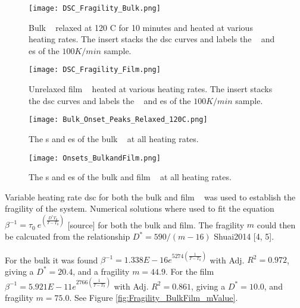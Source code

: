 \documentclass[a4paper,12pt,oneside]{article}%
\begin{document}
\begin{figure}[b]
	\centering
	\texttt{[image: DSC\_Fragility\_Bulk.png]}
	\caption[Table of contents Capition]{Bulk \MgZnCa~ relaxed at 120 \degree C for 10 minutes and heated at various heating rates. The insert stacks the \gls{dsc} curves and labels the \Tg~ and \Tx es of the $100 K/min$ sample.}%
	\label{fig:DSC_vHeatingRate_Bulk}
\end{figure}

\begin{figure}[b]
	\centering
	\texttt{[image: DSC\_Fragility\_Film.png]}
	\caption[Table of contents Capition]{Unrelaxed film \MgZnCa~ heated at various heating rates. The insert stacks the \gls{dsc} curves and labels the \Tg~ and \Tx es of the $100 K/min$ sample.}%
	\label{fig:DSC_vHeatingRate_Film}
\end{figure}

\begin{figure}[b]
	\centering
	\texttt{[image: Bulk\_Onset\_Peaks\_Relaxed\_120C.png]}
	\caption[Table of contents Capition]{The \Tg s and \Tx es of the bulk \MgZnCa~ at all heating rates. }%
	\label{fig:DSC_Onsets_Bulk}
\end{figure}

\begin{figure}[b]
	\centering
	\texttt{[image: Onsets\_BulkandFilm.png]}
	\caption[Table of contents Capition]{The \Tg s and \Tx es of the bulk and film \MgZnCa~ at all heating rates. }%
	\label{fig:DSC_Onsets_BulkFilm}
\end{figure}

Variable heating rate \acrshort{dsc} for both the bulk and film \MgZnCa~ was used to establish the fragility of the system. Numerical solutions where used to fit the equation $\beta^{-1} = \tau_{0}~ e^{(\frac{D^{*}T_{0}}{T-T_{0}})}$ [source] for both the bulk and film. The fragility $m$ could then be calcuated from the relationship $D^{*}=590/(m-16)$ Shuai2014 [4, 5]. 

For the bulk it was found $\beta^{-1} = 1.338E - 16e^{5274 (\frac{1}{T-T_{0}})}$ with Adj. $R^{2}=0.972$, giving a $D^{*}=20.4$, and a fragility $m=44.9$. For the film $\beta^{-1} = 5.921E - 11e^{2766 (\frac{1}{T-T_{0}})}$ with Adj. $R^{2}=0.861$, giving a $D^{*}=10.0$, and fragility $m=75.0$. See Figure \ref{fig:Fragility_BulkFilm_mValue}.
\end{document}
